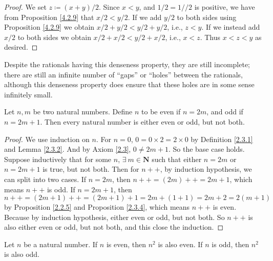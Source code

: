 \begin{proof}
    We set \(z \coloneqq (x + y) / 2\).
    Since \(x < y\), and \(1 / 2 = 1 // 2\) is positive, we have from Proposition \ref{4.2.9} that \(x / 2 < y / 2\).
    If we add \(y / 2\) to both sides using Proposition \ref{4.2.9} we obtain \(x / 2 + y / 2 < y / 2 + y / 2\), i.e., \(z < y\).
    If we instead add \(x / 2\) to both sides we obtain \(x / 2 + x / 2 < y / 2 + x / 2\), i.e., \(x < z\).
    Thus \(x < z < y\) as desired.
\end{proof}

\begin{note}
    Despite the rationals having this denseness property, they are still incomplete;
    there are still an infinite number of ``gaps'' or ``holes'' between the rationals, although this denseness property does ensure that these holes are in some sense infinitely small.
\end{note}

\begin{additional corollary}\label{ac 4.4.2}
Let \(n, m\) be two natural numbers.
Define \(n\) to be even if \(n = 2m\), and odd if \(n = 2m + 1\).
Then every natural number is either even or odd, but not both.
\end{additional corollary}

\begin{proof}
    We use induction on \(n\).
    For \(n = 0\), \(0 = 0 \times 2 = 2 \times 0\) by Definition \ref{2.3.1} and Lemma \ref{2.3.2}.
    And by Axiom \ref{2.3}, \(0 \neq 2m + 1\).
    So the base case holds.
    Suppose inductively that for some \(n\), \(\exists\ m \in \mathbf{N}\) such that either \(n = 2m\) or \(n = 2m + 1\) is true, but not both.
    Then for \(n++\), by induction hypothesis, we can split into two cases.
    If \(n = 2m\), then \(n++ = (2m)++ = 2m + 1\), which means \(n++\) is odd.
    If \(n = 2m + 1\), then \(n++ = (2m + 1)++ = (2m + 1) + 1 = 2m + (1 + 1) = 2m + 2 = 2(m + 1)\) by Proposition \ref{2.2.5} and Proposition \ref{2.3.4}, which means \(n++\) is even.
    Because by induction hypothesis, either even or odd, but not both.
    So \(n++\) is also either even or odd, but not both, and this close the induction.
\end{proof}

\begin{additional corollary}\label{ac 4.4.3}
Let \(n\) be a natural number.
If \(n\) is even, then \(n^2\) is also even.
If \(n\) is odd, then \(n^2\) is also odd.
\end{additional corollary}

